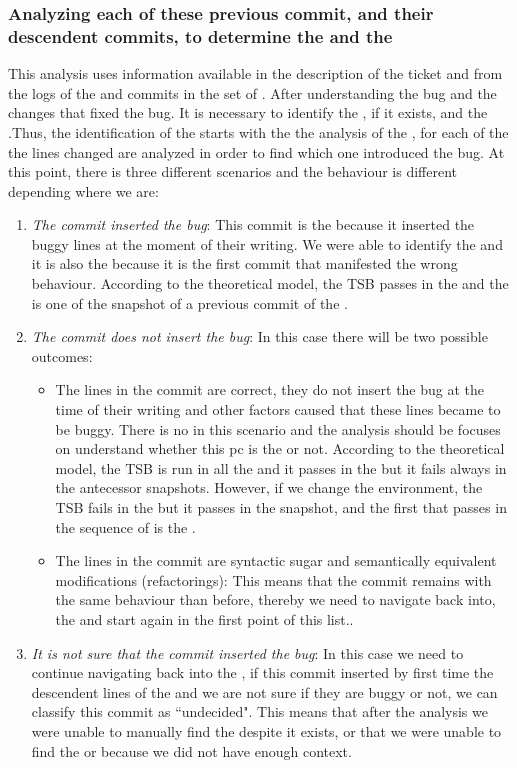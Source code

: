 \documentclass[a4paper, 12pt]{book}
\begin{document}
\subsubsection{Analyzing each of these previous commit, and their descendent commits, to determine the \BIC and the \FFC}

This analysis uses information available in the description of the ticket and from the logs of the \BFC and commits in the set of . After understanding the bug and the changes that fixed the bug. It is necessary to identify the \BIC, if it exists, and the \FFC.Thus, the identification of the \BIC starts with the the analysis of the , for each of the  the lines changed are analyzed in order to find which one introduced the bug. At this point, there is three different scenarios and the behaviour is different depending where we are:
\begin{enumerate}
	\item \textit{The commit inserted the bug}: This commit is the \BIC because it inserted the buggy lines at the moment of their writing. We were able to identify the \BIC and it is also the \FFC because it is the first commit that manifested the wrong behaviour. According to the theoretical model, the TSB passes in the \BFC and the \BIS is one of the snapshot of a previous commit of the \BFC.
	\item \textit{The commit does not insert the bug}: In this case there will be two possible outcomes:
		\begin{itemize}
			\item The lines in the commit are correct, they do not insert the bug at the time of their writing and other factors caused that these lines became to be buggy. There is no \BIC in this scenario and the analysis should be focuses on understand whether this pc is the \FFC or not. According to the theoretical model, the TSB is run in all the  and it passes in the \BFC but it fails always in the antecessor snapshots. However, if we change the environment,  the TSB fails in the \BFC but it passes in the snapshot, and the first \BIS that passes in the sequence of \BIS is the \FFC.
			\item The lines in the commit are syntactic sugar and semantically equivalent modifications (refactorings): This means that the commit remains with the same behaviour than before, thereby we need to navigate back into, the  and start again in the first point of this list..
		\end{itemize}
	\item \textit{It is not sure that the commit inserted the bug}: In this case we need to continue navigating back into the , if this commit inserted by first time the descendent lines of the  and we are not sure if they are buggy or not, we can classify this commit as ``undecided". This means that after the analysis we were unable to manually find the \BIC despite it exists, or that we were unable to find the \FFC or \BIC because we did not have enough context.
\end{enumerate}
\end{document}
